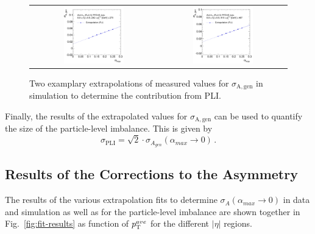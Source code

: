 \begin{figure}[!tp]
  \centering
  \begin{tabular}{cc}
                \includegraphics[width=0.49\textwidth]{figures/Extrapol_Eta0_pt4_gen_final_nominal_v4.pdf} &
                \includegraphics[width=0.49\textwidth]{figures/Extrapol_Eta0_pt9_gen_final_nominal_v4.pdf}
  \end{tabular}
  \caption{Two examplary extrapolations of measured values for $\sigma_\mathrm{A,gen}$ in simulation to determine the contribution from PLI.}
  \label{fig:extrapol_gen}
\end{figure}
Finally, the results of the extrapolated values for $\sigma_\mathrm{A,gen}$ can be used to quantify the size of the particle-level imbalance. This is given by
 \begin{equation}
 \label{eq:pli}
 \sigma_\mathrm{PLI} = \sqrt{2} \cdot \sigma_{A_{gen}}(\alpha_{max} \rightarrow 0) \, .
 \end{equation}

\subsection{Results of the Corrections to the Asymmetry}
\label{subsec:jer_corrections_results} 
The results of the various extrapolation fits to determine $ \sigma_{A}(\alpha_{max} \rightarrow 0)$ in data and simulation as well as for the particle-level imbalance are shown together in Fig.~\ref{fig:fit-results} as function of $p_{\text{T}}^{ave}$ for the different $|\eta|$ regions. 

